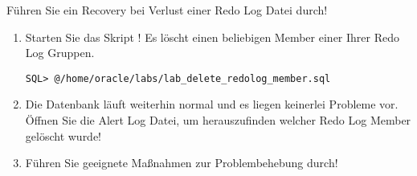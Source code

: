     \item F\"uhren Sie ein Recovery bei Verlust einer Redo Log Datei durch!
      \begin{enumerate}
        \item Starten Sie das Skript ! Es l\"oscht einen beliebigen Member einer Ihrer Redo Log Gruppen.
          \begin{lstlisting}[language=terminal]
SQL> @/home/oracle/labs/lab_delete_redolog_member.sql
          \end{lstlisting}
        \item Die Datenbank l\"auft weiterhin normal und es liegen keinerlei Probleme vor. \"Offnen Sie die Alert Log Datei, um herauszufinden welcher Redo Log Member gel\"oscht wurde!
        \item F\"uhren Sie geeignete Ma\ss{}nahmen zur Problembehebung durch!
      \end{enumerate}
